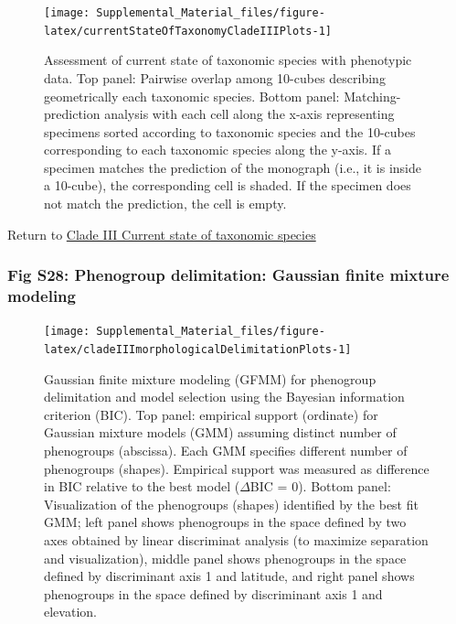 \documentclass[
  11pt,
]{article}
\begin{document}
\begin{figure}
\texttt{[image: Supplemental\_Material\_files/figure-latex/currentStateOfTaxonomyCladeIIIPlots-1]} \caption{Assessment of current state of taxonomic species with phenotypic data. Top panel: Pairwise overlap among 10-cubes describing geometrically each taxonomic species. Bottom panel: Matching-prediction analysis with each cell along the x-axis representing specimens sorted according to taxonomic species and the 10-cubes corresponding to each taxonomic species along the y-axis. If a specimen matches the prediction of the monograph (i.e., it is inside a 10-cube), the corresponding cell is shaded. If the specimen does not match the prediction, the cell is empty.}\label{fig:currentStateOfTaxonomyCladeIIIPlots}
\end{figure}

Return to \protect\hyperlink{current-state-of-taxonomic-species-2}{Clade III Current state of taxonomic species}
\pagebreak

\hypertarget{fig-s28-phenogroup-delimitation-gaussian-finite-mixture-modeling}{%
\subsubsection{Fig S28: Phenogroup delimitation: Gaussian finite mixture modeling}\label{fig-s28-phenogroup-delimitation-gaussian-finite-mixture-modeling}}

\begin{figure}
\texttt{[image: Supplemental\_Material\_files/figure-latex/cladeIIImorphologicalDelimitationPlots-1]} \caption{Gaussian finite mixture modeling (GFMM) for phenogroup delimitation and model selection using the Bayesian information criterion (BIC). Top panel: empirical support (ordinate) for Gaussian mixture models (GMM) assuming distinct number of phenogroups (abscissa). Each GMM specifies different number of phenogroups (shapes). Empirical support was measured as difference in BIC relative to the best model ($\Delta$BIC = $0$). Bottom panel: Visualization of the phenogroups (shapes) identified by the best fit GMM; left panel shows phenogroups in the space defined by two axes obtained by linear discriminat analysis (to maximize separation and visualization), middle panel shows phenogroups in the space defined by discriminant axis 1 and latitude, and right panel shows phenogroups in the space defined by discriminant axis 1 and elevation.}\label{fig:cladeIIImorphologicalDelimitationPlots}
\end{figure}
\end{document}
